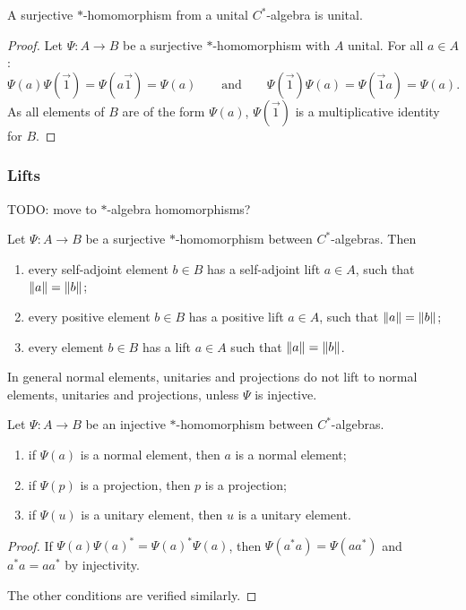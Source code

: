 \begin{lemma}
A surjective $*$-homomorphism from a unital $C^*$-algebra is unital.
\end{lemma}
\begin{proof}
Let $\Psi: A \to B$ be a surjective $*$-homomorphism with $A$ unital. For all $a\in A$:
\[ \Psi(a)\Psi(\vec{1}) = \Psi(a \vec{1}) = \Psi(a) \qquad \text{and} \qquad \Psi(\vec{1})\Psi(a) = \Psi(\vec{1} a) = \Psi(a). \]
As all elements of $B$ are of the form $\Psi(a)$, $\Psi(\vec{1})$ is a multiplicative identity for $B$.
\end{proof}

\subsubsection{Lifts}
TODO: move to $*$-algebra homomorphisms?
\begin{proposition}
Let $\Psi: A \to B$ be a surjective $*$-homomorphism between $C^*$-algebras. Then
\begin{enumerate}
\item every self-adjoint element $b\in B$ has a self-adjoint lift $a\in A$, such that $\lVert a\rVert = \lVert b\rVert$;
\item every positive element $b\in B$ has a positive lift $a\in A$, such that $\lVert a\rVert = \lVert b\rVert$;
\item every element $b\in B$ has a lift $a\in A$ such that $\lVert a\rVert = \lVert b\rVert$.
\end{enumerate}
\end{proposition}
In general normal elements, unitaries and projections do not lift to normal elements, unitaries and projections, unless $\Psi$ is injective.
\begin{lemma} \label{injectiveLifts}
Let $\Psi: A \to B$ be an injective $*$-homomorphism between $C^*$-algebras.
\begin{enumerate}
\item if $\Psi(a)$ is a normal element, then $a$ is a normal element;
\item if $\Psi(p)$ is a projection, then $p$ is a projection;
\item if $\Psi(u)$ is a unitary element, then $u$ is a unitary element.
\end{enumerate}
\end{lemma}
\begin{proof}
If $\Psi(a)\Psi(a)^* = \Psi(a)^*\Psi(a)$, then $\Psi(a^*a) = \Psi(aa^*)$ and $a^*a = aa^*$ by injectivity.

The other conditions are verified similarly.
\end{proof}

